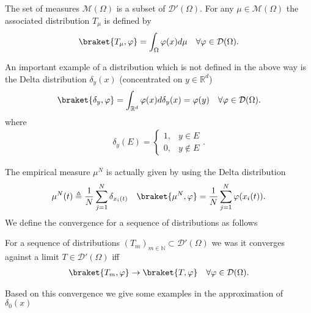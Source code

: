 \begin{example}
 The set of  measures  $\mathcal{M}(\Omega )$ is a subset of $\mathcal{D}'(\Omega )$. 
 For any $\mu \in \mathcal{M}(\Omega )$ the associated distribution $T_{\mu }$ is defined by 
 \begin{align*}
   \braket{T_\mu ,\phi } = \int_\Omega \phi(x) d\mu  \quad \forall \phi  \in \mathcal{D}(\Omega )
 .\end{align*}
\end{example}
\newpage
\begin{example}
 An important example of a distribution which is not defined in the above way
 is the Delta distribution $\delta_y(x)$  (concentrated on $y \in  \mathbb{R}^{d} $) 
 \begin{align*}
   \braket{\delta_y,\phi } = \int_{\mathbb{R}^{d} } \phi(x) d \delta_y(x) = \phi(y) \quad \forall \phi  \in \mathcal{D}(\Omega )
 .\end{align*}
 where 
 \begin{align*}
  \delta_y(E) = \begin{cases}
    1, &y \in  E \\
    0,&y \notin E
  \end{cases}
 .\end{align*}
\end{example}
The empirical measure $\mu ^{N} $ is actually given by using the Delta distribution 
\begin{align*}
  \mu ^{N}(t) \triangleq \frac{1}{N} \sum_{j=1}^{N} \delta_{x_i(t)}   \quad \braket{\mu ^{N},\phi  } = \frac{1}{N} \sum_{j=1}^{N} \phi(x_i(t)) 
.\end{align*}
We define the convergence for a sequence of distributions as follows 
\begin{definition}
  For a sequence of distributions $(T_m)_{m \in  \mathbb{N}} \subset  \mathcal{D}'(\Omega )$  we was it converges against
  a limit $T \in \mathcal{D}'(\Omega )$ iff 
  \begin{align*}
    \braket {T_m,\phi } \to \braket{T,\phi } \quad \forall \phi  \in \mathcal{D}(\Omega )
  .\end{align*}
\end{definition}
Based on this convergence we give some examples in the approximation of $\delta_0(x)$

